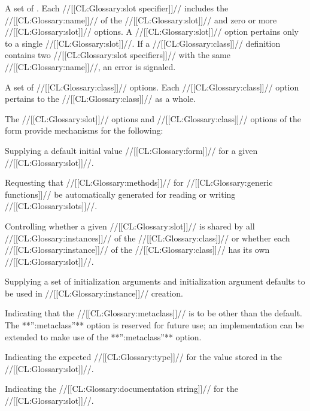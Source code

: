 \itemitem{\bull} A set of .
  Each //[[CL:Glossary:slot specifier]]// includes the //[[CL:Glossary:name]]// of the //[[CL:Glossary:slot]]// 
  and zero or more //[[CL:Glossary:slot]]// options.  A //[[CL:Glossary:slot]]// option pertains 
  only to a single //[[CL:Glossary:slot]]//.  If a //[[CL:Glossary:class]]// definition contains
  two //[[CL:Glossary:slot specifiers]]// with the same //[[CL:Glossary:name]]//, an error is signaled.

\itemitem{\bull} A set of //[[CL:Glossary:class]]// options.  
  Each //[[CL:Glossary:class]]// option pertains to the //[[CL:Glossary:class]]// as a whole.  

\endlist
                                              
The //[[CL:Glossary:slot]]// options and //[[CL:Glossary:class]]// options of 
the  form provide mechanisms for the following:

\beginlist

\itemitem{\bull} Supplying a default initial value //[[CL:Glossary:form]]// 
for a given //[[CL:Glossary:slot]]//.  

\itemitem{\bull} Requesting that //[[CL:Glossary:methods]]// for //[[CL:Glossary:generic functions]]//
be automatically generated for reading or writing //[[CL:Glossary:slots]]//. 

\itemitem{\bull} Controlling whether a given //[[CL:Glossary:slot]]// is shared by 
all //[[CL:Glossary:instances]]//
of the //[[CL:Glossary:class]]// or whether each 
//[[CL:Glossary:instance]]// of the //[[CL:Glossary:class]]// has its own //[[CL:Glossary:slot]]//.

\itemitem{\bull} Supplying a set of initialization arguments and initialization
argument defaults to be used in //[[CL:Glossary:instance]]// creation.




\itemitem{\bull} Indicating that the //[[CL:Glossary:metaclass]]// is to be other 
than the default.  The **'':metaclass''** option is reserved for future use; 
an implementation can be extended to make use of the **'':metaclass''**
option.

\itemitem{\bull} Indicating the expected //[[CL:Glossary:type]]// for the value stored
in the //[[CL:Glossary:slot]]//.

\itemitem{\bull} Indicating the //[[CL:Glossary:documentation string]]// for the //[[CL:Glossary:slot]]//.

\endlist 


